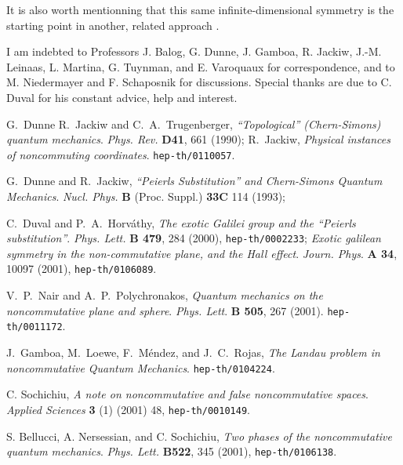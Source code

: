 \documentclass[a4paper,11pt]{article}
\def\parag{\hfil\break} %
\def\kikezd{\parag\underbar}
\begin{document}
  It is also worth mentionning that
  this same infinite-dimensional symmetry is the starting point in another,
  related approach \cite{Stichel}.


  \kikezd{\bf Acknowledgement.}
I am indebted to Professors
J. Balog, G. Dunne, J. Gamboa, R. Jackiw, J.-M. Leinaas, L. Martina,
G. Tuynman, and E. Varoquaux for correspondence,
  and to M. Niedermayer and F. Schaposnik for discussions.
  Special thanks are due to C. Duval for his
  constant advice, help and interest.


\begin{thebibliography}{99}

G.~Dunne R.~Jackiw and C.~A.~Trugenberger,
{\it ``Topological'' (Chern-Simons) quantum mechanics}.
{\sl Phys. Rev.} {\bf D41},  661 (1990);
R.~Jackiw, {\it Physical instances of noncommuting coordinates}.
\texttt{hep-th/0110057}.

G.~Dunne and R.~Jackiw,
  {\it ``Peierls Substitution'' and Chern-Simons Quantum Mechanics}.
{\sl Nucl. Phys.} {\bf B} (Proc. Suppl.) {\bf 33C} 114 (1993);

C.~Duval and P.~A.~Horv\'athy,
  {\it The exotic Galilei group and the ``Peierls substitution''}.
{\sl Phys. Lett.} {\bf B 479}, 284 (2000),
  \texttt{hep-th/0002233};
  {\it Exotic galilean symmetry in the non-commutative plane, and the
Hall effect}.
{\sl Journ. Phys}. {\bf A 34}, 10097 (2001), \texttt{hep-th/0106089}.

V.~P.~Nair and A.~P.~Polychronakos,
{\it Quantum mechanics on the noncommutative plane and sphere}.
{\sl  Phys. Lett}. {\bf B 505}, 267 (2001).
\texttt{hep-th/0011172}.

J.~Gamboa, M.~Loewe, F.~M\'endez, and J.~C.~Rojas,
{\it The Landau problem in noncommutative Quantum Mechanics}.
\texttt{hep-th/0104224}.

C. Sochichiu,
{\it A note on noncommutative and false noncommutative spaces}.
{\sl Applied Sciences} {\bf 3} (1) (2001) 48, \texttt{hep-th/0010149}.

S. Bellucci, A. Nersessian, and C. Sochichiu,
{\it Two phases of the noncommutative quantum mechanics}.
{\sl Phys. Lett.} {\bf B522}, 345 (2001),
\texttt{hep-th/0106138}.



\end{thebibliography}
\end{document}
